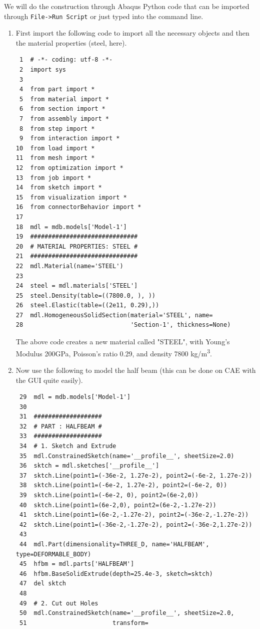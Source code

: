 \documentclass[11pt]{article}
\begin{document}
We will do the construction through Abaqus Python code that can be imported through \texttt{File->Run Script} or just typed into the command line.

\begin{enumerate}
\item First import the following code to import all the necessary objects and then the material properties (steel, here).
\begin{verbatim}
 1  # -*- coding: utf-8 -*-
 2  import sys
 3  
 4  from part import *
 5  from material import *
 6  from section import *
 7  from assembly import *
 8  from step import *
 9  from interaction import *
10  from load import *
11  from mesh import *
12  from optimization import *
13  from job import *
14  from sketch import *
15  from visualization import *
16  from connectorBehavior import *
17  
18  mdl = mdb.models['Model-1']
19  ##############################
20  # MATERIAL PROPERTIES: STEEL #
21  ##############################
22  mdl.Material(name='STEEL')
23  
24  steel = mdl.materials['STEEL']
25  steel.Density(table=((7800.0, ), ))
26  steel.Elastic(table=((2e11, 0.29),))
27  mdl.HomogeneousSolidSection(material='STEEL', name=
28                              'Section-1', thickness=None)
\end{verbatim}
The above code creates a new material called "STEEL", with Young's Modulus 200GPa, Poisson's ratio 0.29, and density 7800 kg/m\textsuperscript{3}.
\item Now use the following to model the half beam (this can be done on CAE with the GUI quite easily).
\begin{verbatim}
 29  mdl = mdb.models['Model-1']
 30  
 31  ###################
 32  # PART : HALFBEAM #
 33  ###################
 34  # 1. Sketch and Extrude
 35  mdl.ConstrainedSketch(name='__profile__', sheetSize=2.0)
 36  sktch = mdl.sketches['__profile__']
 37  sktch.Line(point1=(-36e-2, 1.27e-2), point2=(-6e-2, 1.27e-2))
 38  sktch.Line(point1=(-6e-2, 1.27e-2), point2=(-6e-2, 0))
 39  sktch.Line(point1=(-6e-2, 0), point2=(6e-2,0))
 40  sktch.Line(point1=(6e-2,0), point2=(6e-2,-1.27e-2))
 41  sktch.Line(point1=(6e-2,-1.27e-2), point2=(-36e-2,-1.27e-2))
 42  sktch.Line(point1=(-36e-2,-1.27e-2), point2=(-36e-2,1.27e-2))
 43  
 44  mdl.Part(dimensionality=THREE_D, name='HALFBEAM', type=DEFORMABLE_BODY)
 45  hfbm = mdl.parts['HALFBEAM']
 46  hfbm.BaseSolidExtrude(depth=25.4e-3, sketch=sktch)
 47  del sktch
 48  
 49  # 2. Cut out Holes
 50  mdl.ConstrainedSketch(name='__profile__', sheetSize=2.0,
 51                        transform=

\end{verbatim}
\end{enumerate}
\end{document}
